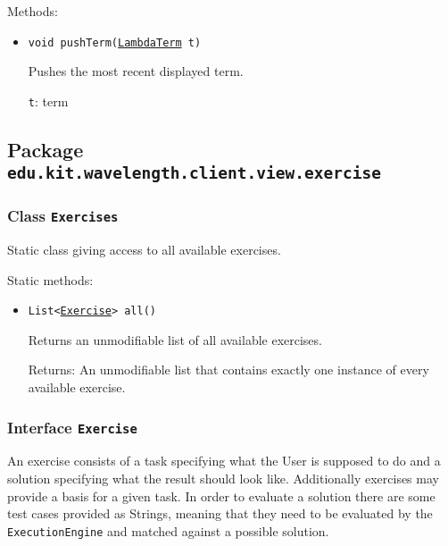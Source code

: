 Methods:
\begin{itemize}
\item \texttt{void pushTerm(\hyperref[type:edu.kit.wavelength.client.model.term.LambdaTerm]{LambdaTerm} t)}

Pushes the most recent displayed term.

\texttt{t}: term

\end{itemize}

\subsection{Package \lstinline{edu.kit.wavelength.client.view.exercise}}
\label{pkg:edu.kit.wavelength.client.view.exercise}


\subsubsection{Class \texttt{Exercises}}
\label{type:edu.kit.wavelength.client.view.exercise.Exercises}
Static class giving access to all available exercises.

Static methods:
\begin{itemize}
\item \texttt{List<\hyperref[type:edu.kit.wavelength.client.view.exercise.Exercise]{Exercise}> all()}

Returns an unmodifiable list of all available exercises.

Returns: An unmodifiable list that contains exactly one instance of every
         available exercise.

\end{itemize}

\subsubsection{Interface \texttt{Exercise}}
\label{type:edu.kit.wavelength.client.view.exercise.Exercise}
An exercise consists of a task specifying what the User is supposed to do and
 a solution specifying what the result should look like. Additionally
 exercises may provide a basis for a given task. In order to evaluate a
 solution there are some test cases provided as Strings, meaning that they
 need to be evaluated by the \texttt{ExecutionEngine} and matched against a
 possible solution.

